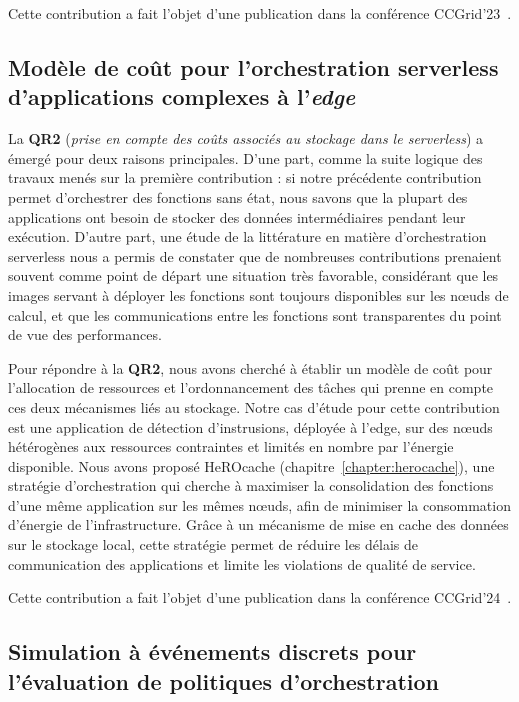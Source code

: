 Cette contribution a fait l'objet d'une publication dans la conférence CCGrid'23~\cite{herofake}.

\subsection{Modèle de coût pour l'orchestration serverless d'applications complexes à l'\textit{edge}}

La \textbf{QR2} (\textit{prise en compte des coûts associés au stockage dans le serverless}) a émergé pour deux raisons principales. D'une part, comme la suite logique des travaux menés sur la première contribution : si notre précédente contribution permet d'orchestrer des fonctions sans état, nous savons que la plupart des applications ont besoin de stocker des données intermédiaires pendant leur exécution. D'autre part, une étude de la littérature en matière d'orchestration serverless nous a permis de constater que de nombreuses contributions prenaient souvent comme point de départ une situation très favorable, considérant que les images servant à déployer les fonctions sont toujours disponibles sur les nœuds de calcul, et que les communications entre les fonctions sont transparentes du point de vue des performances.

Pour répondre à la \textbf{QR2}, nous avons cherché à établir un modèle de coût pour l'allocation de ressources et l'ordonnancement des tâches qui prenne en compte ces deux mécanismes liés au stockage. Notre cas d'étude pour cette contribution est une application de détection d'instrusions, déployée à l'edge, sur des nœuds hétérogènes aux ressources contraintes et limités en nombre par l'énergie disponible. Nous avons proposé HeROcache (chapitre~\ref{chapter:herocache}), une stratégie d'orchestration qui cherche à maximiser la consolidation des fonctions d'une même application sur les mêmes nœuds, afin de minimiser la consommation d'énergie de l'infrastructure. Grâce à un mécanisme de mise en cache des données sur le stockage local, cette stratégie permet de réduire les délais de communication des applications et limite les violations de qualité de service.

Cette contribution a fait l'objet d'une publication dans la conférence CCGrid'24~\cite{herocache}.

\subsection{Simulation à événements discrets pour l'évaluation de politiques d'orchestration}

